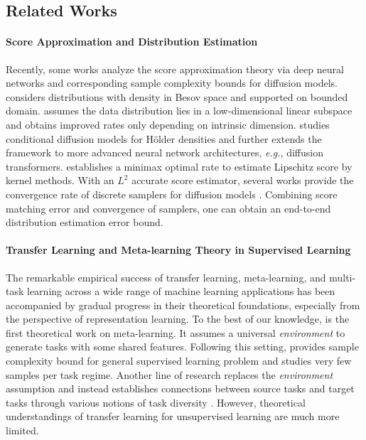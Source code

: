 \documentclass{article}
\numberwithin{equation}{section}
\theoremstyle{definition}
\begin{document}
\subsection{Related Works}

\paragraph{Score Approximation and Distribution Estimation}

Recently, some works analyze the score approximation theory via deep neural networks and corresponding sample complexity bounds for diffusion models.
\citet{oko2023diffusion} considers distributions with density in Besov space and supported on bounded domain.
\citet{chen2023score} assumes the data distribution lies in a low-dimensional linear subspace and obtains improved rates only depending on intrinsic dimension.
\citet{fu2024unveil} studies conditional diffusion models for H\"older densities and \citet{hu2024statistical} further extends the framework to more advanced neural network architectures, \textit{e.g.}, diffusion transformers.
\citet{wibisono2024optimal} establishes a minimax optimal rate to estimate Lipschitz score by kernel methods.
With an $L^2$ accurate score estimator, several works provide the convergence rate of discrete samplers for diffusion models \citep{chen2022sampling,chen2023improved,lee2023convergence,chen2024probability}. 
Combining score matching error and convergence of samplers, one can obtain an end-to-end distribution estimation error bound.

\paragraph{Transfer Learning and Meta-learning Theory in Supervised Learning}

The remarkable empirical success of transfer learning, meta-learning, and multi-task learning across a wide range of machine learning applications has been accompanied by gradual progress in their theoretical foundations, especially from
the perspective of representation learning.
To the best of our knowledge, \citet{baxter2000model} is the first theoretical work on meta-learning.
It assumes a universal \textit{environment} to generate tasks with some shared features.
Following this setting, \citet{maurer2016benefit} provides sample complexity bound for general supervised learning problem and \citet{aliakbarpour2024metalearning} studies very few samples per task regime. 
Another line of research replaces the \textit{environment} assumption and instead establishes connections between source tasks and target tasks through various notions of task diversity \citep{tripuraneni2020theory,du2020few,tripuraneni2021provable,watkins2023optimistic,chua2021fine}.
However, theoretical understandings of transfer learning for unsupervised learning are much more limited.
\end{document}

